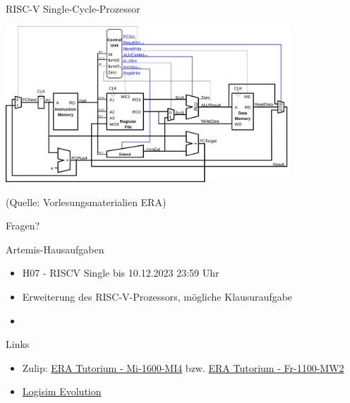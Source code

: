 \documentclass[
  german,            %
  aspectratio=169,    %
]{tumbeamer}
\begin{document}
\begin{frame}[c]{RISC-V Single-Cycle-Prozessor}{}
  \begin{center}
    \includegraphics[width=0.8\textwidth]{w07_single_cycle.png}
  \end{center}
  \centering
  \tiny (Quelle: Vorlesungsmaterialien ERA)
\end{frame}


\begin{frame}[c]{}{}
  \begin{center}
    \LARGE Fragen?
  \end{center}
\end{frame}

\begin{frame}[c, fragile]{Artemis-Hausaufgaben}{}
  \begin{itemize}
    \item H07 - RISCV Single bis 10.12.2023 23:59 Uhr
    \item Erweiterung des RISC-V-Prozessors, mögliche Klausuraufgabe
    \item 
  \end{itemize}
\end{frame}

\begin{frame}[fragile, c]{Links}{}
  \begin{itemize}
    \item Zulip: \href{https://zulip.in.tum.de/#narrow/stream/1917-ERA-Tutorium---Mi-1600-MI4}{\glqq ERA Tutorium - Mi-1600-MI4\grqq}
          bzw. \href{https://zulip.in.tum.de/#narrow/stream/1940-ERA-Tutorium---Fr-1100-MW2}{\glqq ERA Tutorium - Fr-1100-MW2\grqq}
    \item \href{https://github.com/logisim-evolution/logisim-evolution/releases}{Logisim Evolution}
  \end{itemize}
\end{frame}

\maketitle
\end{document}
